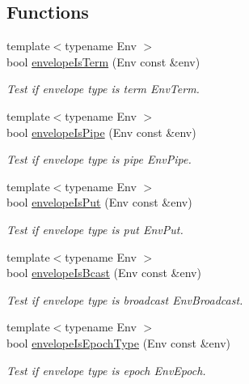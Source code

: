 \subsection*{Functions}
\begin{DoxyCompactItemize}
\item 
{\footnotesize template$<$typename Env $>$ }\\bool \hyperlink{namespacevt_1_1messaging_ad1743de9163dc74a43e6a95e28f49462}{envelope\+Is\+Term} (Env const \&env)
\begin{DoxyCompactList}\small\item\em Test if envelope type is term {\ttfamily Env\+Term}. \end{DoxyCompactList}\item 
{\footnotesize template$<$typename Env $>$ }\\bool \hyperlink{namespacevt_1_1messaging_af97867f7e468ce73a69cd228404c47b0}{envelope\+Is\+Pipe} (Env const \&env)
\begin{DoxyCompactList}\small\item\em Test if envelope type is pipe {\ttfamily Env\+Pipe}. \end{DoxyCompactList}\item 
{\footnotesize template$<$typename Env $>$ }\\bool \hyperlink{namespacevt_1_1messaging_a0a46a75d45e4f2ad55df0f8b2c2a5f2b}{envelope\+Is\+Put} (Env const \&env)
\begin{DoxyCompactList}\small\item\em Test if envelope type is put {\ttfamily Env\+Put}. \end{DoxyCompactList}\item 
{\footnotesize template$<$typename Env $>$ }\\bool \hyperlink{namespacevt_1_1messaging_a54db7616bc28f0aec1a4830acc2105f7}{envelope\+Is\+Bcast} (Env const \&env)
\begin{DoxyCompactList}\small\item\em Test if envelope type is broadcast {\ttfamily Env\+Broadcast}. \end{DoxyCompactList}\item 
{\footnotesize template$<$typename Env $>$ }\\bool \hyperlink{namespacevt_1_1messaging_a35972fd8b7d620e41e94e883e8e0cca4}{envelope\+Is\+Epoch\+Type} (Env const \&env)
\begin{DoxyCompactList}\small\item\em Test if envelope type is epoch {\ttfamily Env\+Epoch}. \end{DoxyCompactList}\item 

\end{DoxyCompactItemize}
